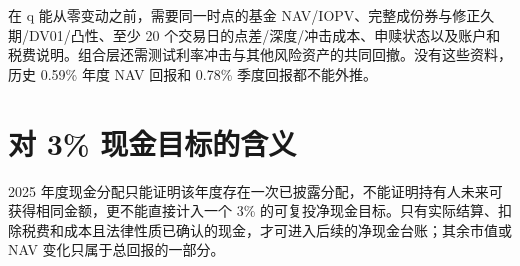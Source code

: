 \begin{riskbox}[升级触发条件]
在 q 能从零变动之前，需要同一时点的基金 NAV/IOPV、完整成份券与修正久期/DV01/凸性、至少 20 个交易日的点差/深度/冲击成本、申赎状态以及账户和税费说明。组合层还需测试利率冲击与其他风险资产的共同回撤。没有这些资料，历史 0.59\% 年度 NAV 回报和 0.78\% 季度回报都不能外推。
\end{riskbox}

\section{对 3\% 现金目标的含义}

2025 年度现金分配只能证明该年度存在一次已披露分配，不能证明持有人未来可获得相同金额，更不能直接计入一个 3\% 的可复投净现金目标。只有实际结算、扣除税费和成本且法律性质已确认的现金，才可进入后续的净现金台账；其余市值或 NAV 变化只属于总回报的一部分。
